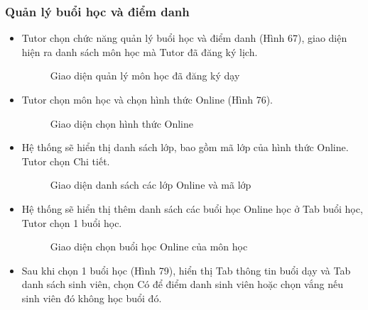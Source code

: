 \subsubsection*{Quản lý buổi học và điểm danh}
\begin{itemize}
    \item Tutor chọn chức năng quản lý buổi học và điểm danh (Hình 67), giao diện hiện ra danh sách môn học mà Tutor đã đăng ký lịch.
    \begin{figure}[H]
    \centering
    \setlength{\fboxsep}{2pt}     
    \setlength{\fboxrule}{0.5pt}   
    \caption{Giao diện quản lý môn học đã đăng ký dạy}
    \end{figure}
    \item Tutor chọn môn học và chọn hình thức Online (Hình 76).
    \begin{figure}[H]
    \centering
    \setlength{\fboxsep}{2pt}     
    \setlength{\fboxrule}{0.5pt}   
    \caption{Giao diện chọn hình thức Online}
    \end{figure}
    \item Hệ thống sẽ hiển thị danh sách lớp, bao gồm mã lớp của hình thức Online. Tutor chọn Chi tiết.
    \begin{figure}[H]
    \centering
    \setlength{\fboxsep}{2pt}     
    \setlength{\fboxrule}{0.5pt}   
    \caption{Giao diện danh sách các lớp Online và mã lớp}
    \end{figure}
    \item Hệ thống sẽ hiển thị thêm danh sách các buổi học Online học ở Tab buổi học, Tutor chọn 1 buổi học.
    \begin{figure}[H]
    \centering
    \setlength{\fboxsep}{2pt}     
    \setlength{\fboxrule}{0.5pt}   
    \caption{Giao diện chọn buổi học Online của môn học}
    \end{figure}
    \item Sau khi chọn 1 buổi học (Hình 79), hiển thị Tab thông tin buổi dạy và Tab danh sách sinh viên, chọn Có để điểm danh sinh viên hoặc chọn vắng nếu sinh viên đó không học buổi đó.
    \begin{figure}[H]
    \centering
    \setlength{\fboxsep}{2pt}     
    \setlength{\fboxrule}{0.5pt}   

\end{figure}
\end{itemize}
